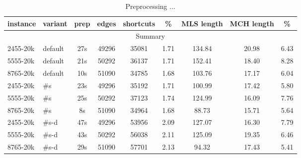 %
%
%
\begin{table}
\caption{Preprocessing ...}
\label{table1}
\begin{tabular}{l|l|c|ccc|ccc}
    instance & variant & prep & edges & shortcuts & \% & MLS length & MCH length & \% \\ \hline
\multicolumn{9}{c}{Summary} \\ \hline
2455-20k & default & 27s & 49296 & 35081 & 1.71 & 134.84 & 20.98 & 6.43 \\ \hline
5555-20k & default & 21s & 50292 & 36137 & 1.71 & 152.41 & 18.40 & 8.28 \\ \hline 
8765-20k & default & 10s & 51090 & 34785 & 1.68 & 103.76 & 17.17 & 6.04 \\ \hline
2455-20k & \#s & 23s & 49296 & 35192 & 1.71 & 100.99 & 17.42 & 5.80 \\ \hline
5555-20k & \#s & 25s & 50292 & 37123 & 1.74 & 124.99 & 16.09 & 7.76 \\ \hline
8765-20k & \#s & 8s & 51090 & 34964 & 1.68 & 88.73 & 15.71 & 5.64 \\ \hline
2455-20k & \#s-d & 47s & 49296 & 53956 & 2.09 & 127.07 & 16.30 & 7.79 \\ \hline
5555-20k & \#s-d & 43s & 50292 & 56038 & 2.11 & 125.09 & 19.35 & 6.46 \\ \hline
8765-20k & \#s-d & 29s & 51090 & 57701 & 2.13 & 94.32 & 17.43 & 5.41 \\ \hline

\end{tabular}
\end{table}

